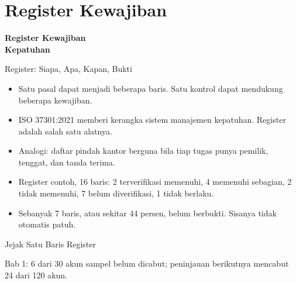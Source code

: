 \documentclass[aspectratio=169, table, 12pt]{beamer}
\begin{document}
\section{Register Kewajiban}

\begin{frame}{\hfill}
  \centering
  \Huge{\textbf{Register Kewajiban\\Kepatuhan}}
\end{frame}

\begin{frame}{{\Large Register: Siapa, Apa, Kapan, Bukti}}
  \vspace{4pt}
  \small
  \begin{itemize}
    \item Satu pasal dapat menjadi beberapa baris. Satu kontrol dapat mendukung beberapa kewajiban.
    \item ISO 37301:2021 memberi kerangka sistem manajemen kepatuhan. Register adalah salah satu alatnya.
    \item Analogi: daftar pindah kantor berguna bila tiap tugas punya pemilik, tenggat, dan tanda terima.
    \item Register contoh, 16 baris: 2 terverifikasi memenuhi, 4 memenuhi sebagian, 2 tidak memenuhi,
          7 belum diverifikasi, 1 tidak berlaku.
    \item Sebanyak 7 baris, atau sekitar 44 persen, belum berbukti. Sisanya tidak otomatis patuh.
  \end{itemize}
\end{frame}

\begin{frame}{{\Large Jejak Satu Baris Register}}
  \centering
  \vspace{6pt}
  \resizebox{0.97\textwidth}{!}{}

  \vspace{10pt}
  \raggedright\small Bab 1: 6 dari 30 akun sampel belum dicabut; peninjauan berikutnya mencabut 24 dari 120 akun.
\end{frame}
\end{document}

